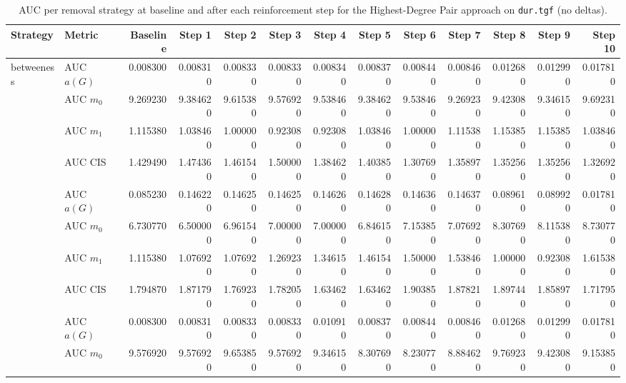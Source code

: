 \begin{table}[htbp]
  \centering
  \caption{AUC per removal strategy at baseline and after each reinforcement step for the Highest-Degree Pair approach on \texttt{dur.tgf} (no deltas).}
  \label{tab:dur-highest_degree_pair-auc}
\setlength{\tabcolsep}{2.5pt}
  \begin{tabular}{llrrrrrrrrrrr}
    \toprule
    \textbf{Strategy} & \textbf{Metric} & \textbf{Baseline} & \textbf{Step 1} & \textbf{Step 2} & \textbf{Step 3} & \textbf{Step 4} & \textbf{Step 5} & \textbf{Step 6} & \textbf{Step 7} & \textbf{Step 8} & \textbf{Step 9} & \textbf{Step 10} \\
    \midrule
    \multirow{4}{*}{betweeness} & AUC $a(G)$ & 0.008300 & 0.008310 & 0.008330 & 0.008330 & 0.008340 & 0.008370 & 0.008440 & 0.008460 & 0.012680 & 0.012990 & 0.017810 \\
    & AUC $m_0$ & 9.269230 & 9.384620 & 9.615380 & 9.576920 & 9.538460 & 9.384620 & 9.538460 & 9.269230 & 9.423080 & 9.346150 & 9.692310 \\
    & AUC $m_1$ & 1.115380 & 1.038460 & 1.000000 & 0.923080 & 0.923080 & 1.038460 & 1.000000 & 1.115380 & 1.153850 & 1.153850 & 1.038460 \\
    & AUC CIS & 1.429490 & 1.474360 & 1.461540 & 1.500000 & 1.384620 & 1.403850 & 1.307690 & 1.358970 & 1.352560 & 1.352560 & 1.326920 \\
    \addlinespace
    \multirow{4}{*}{closeness} & AUC $a(G)$ & 0.085230 & 0.146220 & 0.146250 & 0.146250 & 0.146260 & 0.146280 & 0.146360 & 0.146370 & 0.089610 & 0.089920 & 0.017810 \\
    & AUC $m_0$ & 6.730770 & 6.500000 & 6.961540 & 7.000000 & 7.000000 & 6.846150 & 7.153850 & 7.076920 & 8.307690 & 8.115380 & 8.730770 \\
    & AUC $m_1$ & 1.115380 & 1.076920 & 1.076920 & 1.269230 & 1.346150 & 1.461540 & 1.500000 & 1.538460 & 1.000000 & 0.923080 & 1.615380 \\
    & AUC CIS & 1.794870 & 1.871790 & 1.769230 & 1.782050 & 1.634620 & 1.634620 & 1.903850 & 1.878210 & 1.897440 & 1.858970 & 1.717950 \\
    \addlinespace
    \multirow{4}{*}{core influence} & AUC $a(G)$ & 0.008300 & 0.008310 & 0.008330 & 0.008330 & 0.010910 & 0.008370 & 0.008440 & 0.008460 & 0.012680 & 0.012990 & 0.017810 \\
    & AUC $m_0$ & 9.576920 & 9.576920 & 9.653850 & 9.576920 & 9.346150 & 8.307690 & 8.230770 & 8.884620 & 9.769230 & 9.423080 & 9.153850 \\

\end{tabular}
\end{table}
